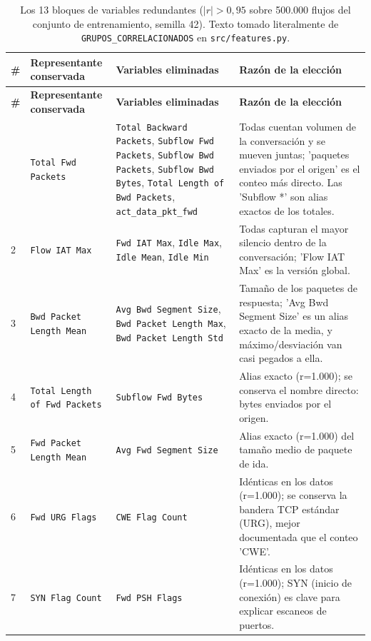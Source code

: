\documentclass[11pt,a4paper]{article}
\begin{document}
{\footnotesize
\begin{longtable}{C{0.6cm} L{3.0cm} L{4.2cm} L{6.3cm}}
\caption{Los 13 bloques de variables redundantes ($|r| > 0{,}95$ sobre 500.000 flujos del conjunto de entrenamiento, semilla 42). Texto tomado literalmente de \texttt{GRUPOS\_CORRELACIONADOS} en \texttt{src/features.py}.}\label{tab:bloques}\\
\toprule
\textbf{\#} & \textbf{Representante conservada} & \textbf{Variables eliminadas} & \textbf{Razón de la elección} \\
\midrule
\endfirsthead
\toprule
\textbf{\#} & \textbf{Representante conservada} & \textbf{Variables eliminadas} & \textbf{Razón de la elección} \\
\midrule
\endhead
\bottomrule
{} & \texttt{Total Fwd Packets} & \texttt{Total Backward Packets}, \texttt{Subflow Fwd Packets}, \texttt{Subflow Bwd Packets}, \texttt{Subflow Bwd Bytes}, \texttt{Total Length of Bwd Packets}, \texttt{act\_data\_pkt\_fwd} & Todas cuentan volumen de la conversación y se mueven juntas; 'paquetes enviados por el origen' es el conteo más directo. Las 'Subflow *' son alias exactos de los totales. \\
2 & \texttt{Flow IAT Max} & \texttt{Fwd IAT Max}, \texttt{Idle Max}, \texttt{Idle Mean}, \texttt{Idle Min} & Todas capturan el mayor silencio dentro de la conversación; 'Flow IAT Max' es la versión global. \\
3 & \texttt{Bwd Packet Length Mean} & \texttt{Avg Bwd Segment Size}, \texttt{Bwd Packet Length Max}, \texttt{Bwd Packet Length Std} & Tamaño de los paquetes de respuesta; 'Avg Bwd Segment Size' es un alias exacto de la media, y máximo/desviación van casi pegados a ella. \\
4 & \texttt{Total Length of Fwd Packets} & \texttt{Subflow Fwd Bytes} & Alias exacto (r=1.000); se conserva el nombre directo: bytes enviados por el origen. \\
5 & \texttt{Fwd Packet Length Mean} & \texttt{Avg Fwd Segment Size} & Alias exacto (r=1.000) del tamaño medio de paquete de ida. \\
6 & \texttt{Fwd URG Flags} & \texttt{CWE Flag Count} & Idénticas en los datos (r=1.000); se conserva la bandera TCP estándar (URG), mejor documentada que el conteo 'CWE'. \\
7 & \texttt{SYN Flag Count} & \texttt{Fwd PSH Flags} & Idénticas en los datos (r=1.000); SYN (inicio de conexión) es clave para explicar escaneos de puertos. \\

\end{longtable}}
\end{document}
